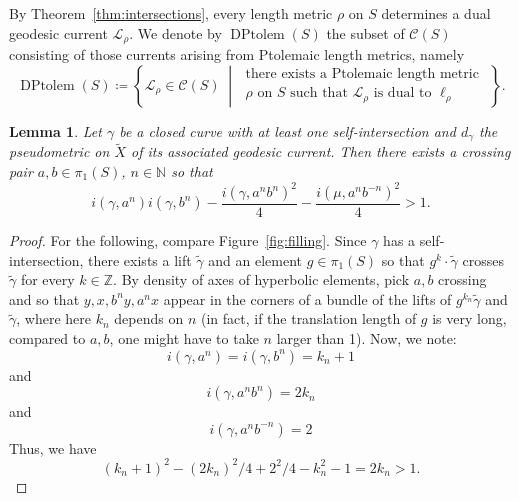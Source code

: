 \documentclass[12pt]{amsart}
\numberwithin{equation}{section}
\numberwithin{figure}{section}
\newtheorem{lemma}[equation]{Lemma}
\theoremstyle{definition}
\theoremstyle{plain}
\newcommand\C{\mathcal{C}}
\newcommand*{\wt}[1]{\widetilde{#1}}
\begin{document}
By Theorem~\ref{thm:intersections}, every length metric $\rho$ on $S$ determines a dual geodesic current $\mathcal{L}_\rho$.
We denote by $\operatorname{DPtolem}(S)$ the subset of $\C(S)$ consisting of those currents arising from Ptolemaic length metrics, namely
\[
\operatorname{DPtolem}(S)
\coloneqq
\left\{
\mathcal{L}_\rho \in \C(S)
\;\middle|\;
\begin{array}{l}
\text{there exists a Ptolemaic length metric } \\ \rho \text{ on } S 
\text{ such that } \mathcal{L}_\rho \text{ is dual to } \ell_\rho
\end{array}
\right\}.
\]

\begin{lemma}
Let $\gamma$ be a closed curve with at least one self-intersection
and $d_{\gamma}$ the pseudometric on $\wt{X}$ of its associated geodesic current. Then there exists a crossing pair $a,b \in \pi_1(S)$, $n \in \mathbb{N}$ so that
\[
i(\gamma, a^n) i(\gamma,b^n) -\frac{i(\gamma,a^nb^n)^2}{4} -  \frac{i(\mu,a^nb^{-n})^2}{4}>1.
\]
\label{lem:notptolemaic}
\end{lemma}
\begin{proof}
For the following, compare Figure~\ref{fig:filling}.
Since $\gamma$ has a self-intersection, there exists a lift $\wt{\gamma}$ and an element $g \in \pi_1(S)$ so that
$g^k \cdot \wt{\gamma}$ crosses $\wt{\gamma}$ for every $k \in \mathbb{Z}$.
By density of axes of hyperbolic elements, pick $a,b$ crossing and so that $y, x, b^n y, a^n x$ appear in the corners of a bundle of the lifts of $g^{k_n} \wt{\gamma}$ and $\wt{\gamma}$, where here $k_n$ depends on $n$ (in fact, if the translation length of $g$ is very long, compared to $a,b$, one might have to take $n$ larger than 1).
Now, we note:
\[
i(\gamma, a^n) = i(\gamma, b^n) = k_n +1
\]
and
\[
i(\gamma, a^nb^n) = 2 k_n
\]
and
\[
i(\gamma, a^nb^{-n}) = 2
\]
Thus, we have
\[
(k_n+1)^2 - (2k_n)^2/4+ 2^2/4 - k_n^2- 1 = 2k_n>1.
\]
\end{proof}
\end{document}
